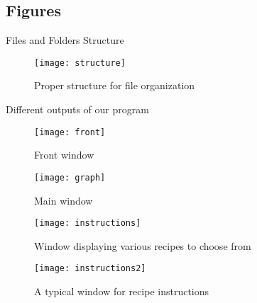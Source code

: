 \documentclass[fontsize=11pt]{article}
\begin{document}
    \newpage
    \begin{center}
        \section*{Figures}

        \Large{Files and Folders Structure}
    \end{center}
    \begin{figure}[h]
        \centering
        \texttt{[image: structure]}
        \caption{Proper structure for file organization}
        \label{fig:file_structure}
    \end{figure}

    \begin{center}
        \Large{Different outputs of our program}
    \end{center}
    \begin{figure}[h]
        \centering
        \texttt{[image: front]}
        \caption{Front window}
        \label{fig:front}
    \end{figure}

    \begin{figure}[h]
        \centering
        \texttt{[image: graph]}
        \caption{Main window}
        \label{fig:main}
    \end{figure}

    \begin{figure}[h]
        \centering
        \texttt{[image: instructions]}
        \caption{Window displaying various recipes to choose from}
        \label{fig:recipe_choice}
    \end{figure}

    \begin{figure}[h]
        \centering
        \texttt{[image: instructions2]}
        \caption{A typical window for recipe instructions}
        \label{fig:recipe}
    \end{figure}
\end{document}
